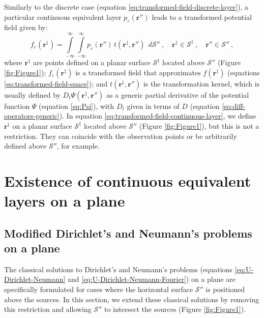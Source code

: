 \documentclass[manuscript,noblind]{geophysics}
\begin{document}
	Similarly to the discrete case (equation \ref{eq:transformed-field-discrete-layer}), a particular continuous equivalent layer 
	$p_{\varepsilon}(\mathbf{r}'')$ leads to a transformed potential field given by:
	\begin{equation}
		f_{\varepsilon}(\mathbf{r}^{\ddagger})
		= \int\limits_{-\infty}^{\infty}\int\limits_{-\infty}^{\infty}
		p_{\varepsilon}(\mathbf{r}'') \, t(\mathbf{r}^{\ddagger}, \mathbf{r}'') \:\: d\mathcal{S}'' \: , 
		\quad \mathbf{r}^{\ddagger} \in \mathcal{S}^{\ddagger} \: ,
		\quad \mathbf{r}'' \in \mathcal{S}'' \: ,
		\label{eq:transformed-field-continuous-layer}
	\end{equation}
	where $\mathbf{r}^{\ddagger}$ are points defined on a planar surface $\mathcal{S}^{\ddagger}$ located above $\mathcal{S}''$ (Figure \ref{fig:Figure1}); 
	$f_{\varepsilon}(\mathbf{r}^{\ddagger})$ is a transformed field that approximates 
	$f(\mathbf{r}^{\ddagger})$ (equations \ref{eq:transformed-field-space}); and
	$t(\mathbf{r}^{\ddagger}, \mathbf{r}'')$ is the transformation kernel,
	which is usually defined by $D_{t} \Psi(\mathbf{r}^{\ddagger}, \mathbf{r}'')$ as a generic partial 
	derivative of the potential function $\Psi$
	(equation \ref{eq:Psi}), with $D_{t}$ given in terms of $D$ (equation \ref{eq:diff-operators-generic}).
	In equation \ref{eq:transformed-field-continuous-layer}, we define $\mathbf{r}^{\ddagger}$ on 
	a planar surface $\mathcal{S}^{\ddagger}$ located above $\mathcal{S}''$ (Figure \ref{fig:Figure1}), but this is not a 
	restriction. They can coincide with the observation points or be arbitrarily defined above $\mathcal{S}''$, for example.
	
	\section{Existence of continuous equivalent layers on a plane}
	\label{sec:planar_eqlayer_theorem}
	
	\subsection{Modified Dirichlet's and Neumann's problems on a plane}
	
	The classical solutions to Dirichlet’s and Neumann’s problems (equations \ref{eq:U-Dirichlet-Neumann} 
	and \ref{eq:U-Dirichlet-Neumann-Fourier}) on a plane are specifically formulated for cases where 
	the horizontal surface $\mathcal{S}''$ is positioned above the sources. In this section, we extend 
	these classical solutions by removing this restriction and allowing $\mathcal{S}''$ to intersect 
	the sources (Figure \ref{fig:Figure1}).
	
\end{document}

